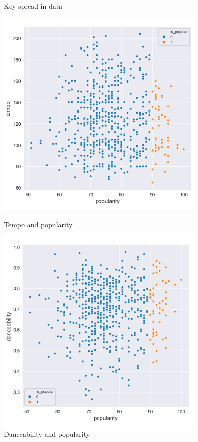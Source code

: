 \begin{figure}[h]
\begin{minipage}{0.45\textwidth}
        \caption{Key spread in data}
        \label{fig:keycount}
    \end{minipage}
    \begin{minipage}{0.45\textwidth}
        \centering
        \includegraphics[width=0.9\textwidth]{methodology/fig/temppop2.PNG} %
        \caption{Tempo and popularity}
        \label{fig:temppop}
    \end{minipage}\hfill
    \begin{minipage}{0.45\textwidth}
        \centering
        \includegraphics[width=0.9\textwidth]{methodology/fig/dancepop.PNG} %
        \caption{Danceability and popularity}
        \label{fig:dancepop}
    \end{minipage}
\end{figure}

